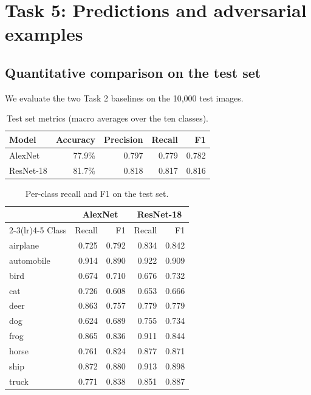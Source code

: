 \documentclass[11pt,a4paper]{article}
\begin{document}
\section{Task 5: Predictions and adversarial examples}

\subsection{Quantitative comparison on the test set}
We evaluate the two Task 2 baselines on the 10,000 test images.

\begin{table}[htbp]\centering\small
\caption{Test set metrics (macro averages over the ten classes).}
\begin{tabular}{lrrrr}\toprule
Model & Accuracy & Precision & Recall & F1\\\midrule
AlexNet & 77.9\% & 0.797 & 0.779 & 0.782\\
ResNet-18 & 81.7\% & 0.818 & 0.817 & 0.816\\\bottomrule
\end{tabular}\end{table}

\begin{table}[htbp]\centering\small
\caption{Per-class recall and F1 on the test set.}
\begin{tabular}{lrrrr}\toprule
& \multicolumn{2}{c}{AlexNet} & \multicolumn{2}{c}{ResNet-18}\\\cmidrule(lr){2-3}\cmidrule(lr){4-5}
Class & Recall & F1 & Recall & F1\\\midrule
airplane & 0.725 & 0.792 & 0.834 & 0.842\\
automobile & 0.914 & 0.890 & 0.922 & 0.909\\
bird & 0.674 & 0.710 & 0.676 & 0.732\\
cat & 0.726 & 0.608 & 0.653 & 0.666\\
deer & 0.863 & 0.757 & 0.779 & 0.779\\
dog & 0.624 & 0.689 & 0.755 & 0.734\\
frog & 0.865 & 0.836 & 0.911 & 0.844\\
horse & 0.761 & 0.824 & 0.877 & 0.871\\
ship & 0.872 & 0.880 & 0.913 & 0.898\\
truck & 0.771 & 0.838 & 0.851 & 0.887\\\bottomrule
\end{tabular}\end{table}
\end{document}

